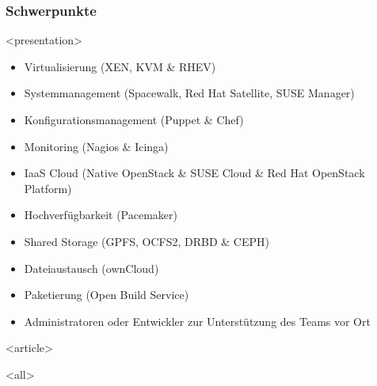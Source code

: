 \begin{frame}[fragile]
\frametitle<presentation>{Schwerpunkte}

 
\mode
<presentation>

\begin{itemize}
\item Virtualisierung (XEN, KVM \& RHEV)
\item Systemmanagement (Spacewalk, Red Hat Satellite, SUSE Manager)
\item Konfigurationsmanagement (Puppet \& Chef)
\item Monitoring (Nagios \& Icinga)
\item IaaS Cloud (Native OpenStack \& SUSE Cloud \& Red Hat OpenStack Platform)
\item Hochverfügbarkeit (Pacemaker)
\item Shared Storage (GPFS, OCFS2, DRBD \& CEPH)
\item Dateiaustausch (ownCloud)
\item Paketierung (Open Build Service)
\item Administratoren oder Entwickler zur Unterstützung des Teams vor Ort
\end{itemize}


\mode
<article>

\mode
<all>

\end{frame}
\newpage

\clearpage

